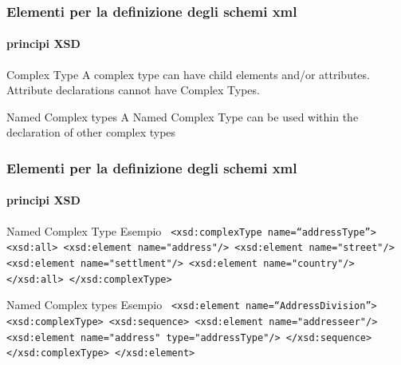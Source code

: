


\begin{frame}
	\frametitle{Elementi per la definizione degli schemi xml}
	\framesubtitle{principi XSD}
	\addtocounter{nframe}{1}

	\begin{block}{Complex Type}
		A complex type can have child elements and/or attributes.
		\\ Attribute declarations cannot have Complex Types.

	\end{block}

	\begin{block}{Named Complex types}
		A Named Complex Type can be used within the declaration of other complex types
	\end{block}

\end{frame}




\begin{frame}
	\frametitle{Elementi per la definizione degli schemi xml}
	\framesubtitle{principi XSD}
	\addtocounter{nframe}{1}

	\begin{block}{Named Complex Type Esempio}
		\texttt{
			  <xsd:complexType name=``addressType''>
     			<xsd:all>
       				<xsd:element name="address"/>
       				<xsd:element name="street"/>
       				<xsd:element name="settlment"/>
       				<xsd:element name="country"/>
				 </xsd:all>
			 </xsd:complexType>
		}
	\end{block}

	\begin{block}{Named Complex types Esempio}
		\texttt{
			<xsd:element name=``AddressDivision''>
    			<xsd:complexType>
      			<xsd:sequence>
        			<xsd:element name="addresseer"/>
					<xsd:element name="address" type="addressType"/>
				</xsd:sequence>
				</xsd:complexType>
			</xsd:element>
		}
	\end{block}

\end{frame}


